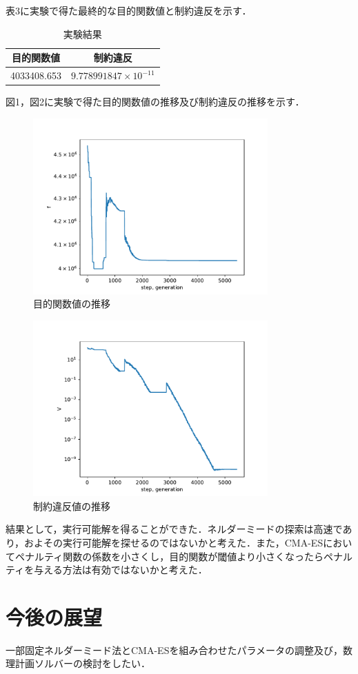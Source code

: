 \documentclass[twocolumn]{jarticle}
\begin{document}
    表3に実験で得た最終的な目的関数値と制約違反を示す．
    \begin{table}[htbp] %
		\begin{center}
			\caption{実験結果}
			\begin{tabular}{| c | c |} \hline
				目的関数値 & 制約違反 \\ \hline 
				4033408.653 &   $9.778991847\times10^{-11}$ \\ \hline
			\end{tabular}
		\end{center}
	\end{table}
    図1，図2に実験で得た目的関数値の推移及び制約違反の推移を示す．
    \begin{figure}	%
        \centering
        \includegraphics[width=9cm]{img_f.pdf}
        \caption{目的関数値の推移}
    \end{figure}

    \begin{figure}	%
        \centering
        \includegraphics[width=9cm]{img_V.pdf}
        \caption{制約違反値の推移}
    \end{figure}
    結果として，実行可能解を得ることができた．ネルダーミードの探索は高速であり，およその実行可能解を探せるのではないかと考えた．また，CMA-ESにおいてペナルティ関数の係数を小さくし，目的関数が閾値より小さくなったらペナルティを与える方法は有効ではないかと考えた．


\section{今後の展望}
    一部固定ネルダーミード法とCMA-ESを組み合わせたパラメータの調整及び，数理計画ソルバーの検討をしたい．


\end{document}
